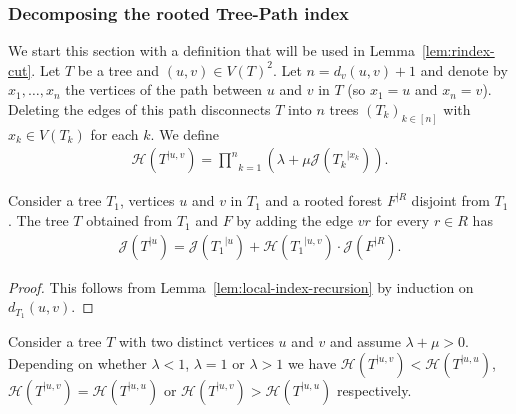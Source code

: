 \documentclass[11 pt]{modarticle}
\newcommand{\vsetof}[1]{V(#1)}
\newcommand{\distance}[3]{d_{#3}(#1,#2)}
\newcommand{\rtree}[2]{{#1}^{\lvert #2}}
\newcommand{\rindexsymbol}{\mathcal{J}}
\newcommand{\rindex}[2]{\rindexsymbol(\rtree{#2}{#1})}
\newcommand{\aindexsymbol}{\mathcal{H}}
\newcommand{\aindex}[3]{\aindexsymbol(\rtree{#3}{#1, #2})}
\begin{document}
\subsubsection{Decomposing the rooted Tree-Path index}

We start this section with a definition that will be used in Lemma~\ref{lem:rindex-cut}. Let $T$ be a tree and $(u,v)\in\vsetof{T}^2$. Let $n=\distance{u}{v}{v} + 1$ and denote by $x_1, \dots, x_n$ the vertices of the path between $u$ and $v$ in $T$ (so $x_1 = u$ and $x_n = v$). Deleting the edges of this path disconnects $T$ into $n$ trees $(T_k)_{k\in[n]}$ with $x_k\in\vsetof{T_k}$ for each $k$. We define
\begin{eqnarray}
	\aindex{u}{v}{T} = \underset{k=1}{\overset{n}{\prod}} (\lambda + \mu \rindex{x_k}{T_k}). \label{eq:aindex}
\end{eqnarray}

\begin{lem}\label{lem:rindex-cut}
	Consider a tree $T_1$, vertices $u$ and $v$ in $T_1$ and a rooted forest $\rtree{F}{R}$ disjoint from $T_1$. The tree $T$ obtained from $T_1$ and $F$ by adding the edge $vr$ for every $r \in R$ has
\begin{eqnarray*}
	\rindex{u}{T} = \rindex{u}{T_1} + \aindex{u}{v}{T_1} \cdot \rindex{R}{F}.
\end{eqnarray*}
\end{lem}

\begin{proof}
This follows from Lemma~\ref{lem:local-index-recursion} by induction on $\distance{u}{v}{T_1}$.
\end{proof}


\begin{lem}\label{lem:aindex-comp}
Consider a tree $T$ with two distinct vertices $u$ and $v$ and assume $\lambda + \mu > 0$. Depending on whether $\lambda < 1$, $\lambda = 1$ or $\lambda > 1$ we have  $\aindex{u}{v}{T} < \aindex{u}{u}{T}$, $\aindex{u}{v}{T} = \aindex{u}{u}{T}$ or $\aindex{u}{v}{T} > \aindex{u}{u}{T}$ respectively.
\end{lem}
\end{document}
